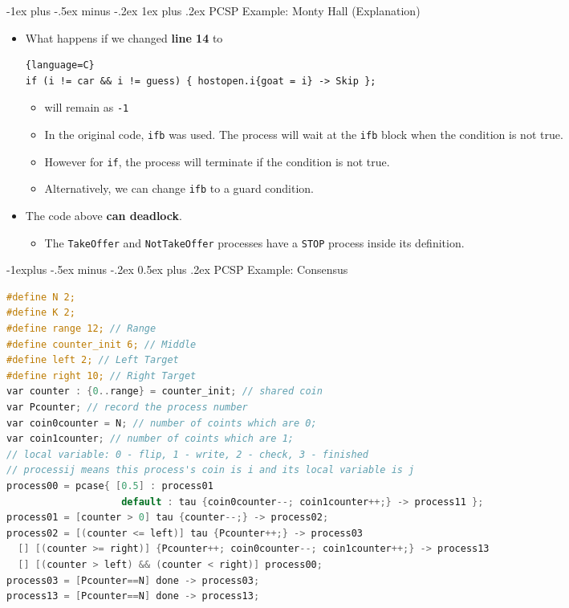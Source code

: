 \documentclass[10pt, landscape]{article}
\makeatletter
\renewcommand{\subsection}{\@startsection{subsection}{2}{0mm}%
  {-1explus -.5ex minus -.2ex}%
  {0.5ex plus .2ex}%
{\normalfont\normalsize\bfseries}}
\renewcommand{\subsubsection}{\@startsection{subsubsection}{3}{0mm}%
  {-1ex plus -.5ex minus -.2ex}%
  {1ex plus .2ex}%
{\normalfont\small\bfseries}}%
\makeatother
\begin{document}
\begin{multicols*}{2}
  \subsubsection{PCSP Example: Monty Hall (Explanation)}
\begin{itemize}
    \item What happens if we changed \textbf{line 14} to
\begin{lstlisting}{language=C}
if (i != car && i != guess) { hostopen.i{goat = i} -> Skip };
\end{lstlisting}
    \begin{itemize}
        \item {} will remain as \texttt{-1}
        \item In the original code, \texttt{ifb} was used. The process will wait at the \texttt{ifb} block when the condition is not true.
        \item However for \texttt{if}, the process will terminate if the condition is not true.
        \item Alternatively, we can change \texttt{ifb} to a guard condition.
    \end{itemize}
    \item The code above \textbf{can deadlock}.
    \begin{itemize}
        \item The \texttt{TakeOffer} and \texttt{NotTakeOffer} processes have a \texttt{STOP} process inside its definition.
    \end{itemize}
\end{itemize}

\subsection{PCSP Example: Consensus}
\begin{lstlisting}[language=C, basicstyle=\scriptsize\selectfont\ttfamily, mathescape]
#define N 2;
#define K 2;
#define range 12; // Range
#define counter_init 6; // Middle
#define left 2; // Left Target
#define right 10; // Right Target
var counter : {0..range} = counter_init; // shared coin
var Pcounter; // record the process number
var coin0counter = N; // number of coints which are 0;
var coin1counter; // number of coints which are 1;
// local variable: 0 - flip, 1 - write, 2 - check, 3 - finished
// processij means this process's coin is i and its local variable is j
process00 = pcase{ [0.5] : process01
                    default : tau {coin0counter--; coin1counter++;} -> process11 };
process01 = [counter > 0] tau {counter--;} -> process02;
process02 = [(counter <= left)] tau {Pcounter++;} -> process03
  [] [(counter >= right)] {Pcounter++; coin0counter--; coin1counter++;} -> process13 
  [] [(counter > left) && (counter < right)] process00;
process03 = [Pcounter==N] done -> process03;
process13 = [Pcounter==N] done -> process13;


\end{lstlisting}
\end{multicols*}
\end{document}
